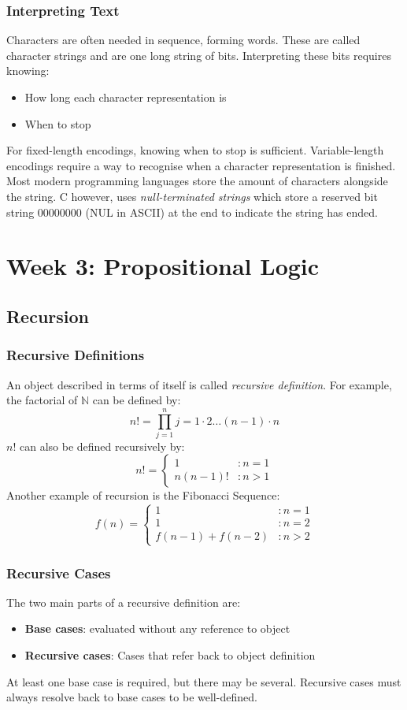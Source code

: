 \documentclass{article}
\begin{document}
\subsubsection{Interpreting Text}
Characters are often needed in sequence, forming words.
These are called character strings and are one long string of bits.
Interpreting these bits requires knowing:
\begin{itemize}
    \item How long each character representation is
    \item When to stop
\end{itemize}
For fixed-length encodings, knowing when to stop is sufficient.
Variable-length encodings require a way to recognise when a character representation is finished.
Most modern programming languages store the amount of characters alongside the string.
C however, uses \emph{null-terminated strings} which store a reserved bit string 00000000 (NUL in ASCII)
at the end to indicate the string has ended.

\newpage
\section{Week 3: Propositional Logic}
\subsection{Recursion}
\subsubsection{Recursive Definitions}
An object described in terms of itself is called \emph{recursive definition}.
For example, the factorial of \(\mathbb{N}\) can be defined by:
\[n! = \prod_{j=1}^{n} j = 1 \cdot 2 \dots (n-1) \cdot n\]
\(n!\) can also be defined recursively by:
\[
    n! = 
    \begin{cases}
        1       &: n = 1 \\
        n(n-1)! &: n > 1
    \end{cases}
\]
Another example of recursion is the Fibonacci Sequence:
\[
    f(n) = 
    \begin{cases}
        1               &: n = 1 \\
        1               &: n = 2 \\
        f(n-1) + f(n-2) &: n > 2
    \end{cases}
\]
%
\subsubsection{Recursive Cases}
The two main parts of a recursive definition are:
\begin{itemize}
    \item \textbf{Base cases}: evaluated without any reference to object
    \item \textbf{Recursive cases}: Cases that refer back to object definition
\end{itemize}
At least one base case is required, but there may be several.
Recursive cases must always resolve back to base cases to be well-defined.
%
\end{document}
